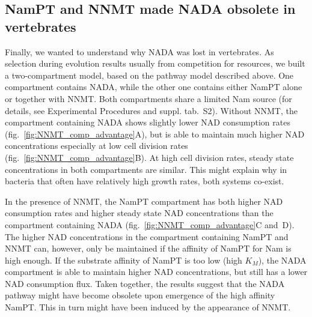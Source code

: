\subsection{NamPT and NNMT made NADA obsolete in vertebrates}

Finally, we wanted to understand why NADA was lost in vertebrates. As selection during evolution results usually from competition for resources, we built a two-compartment model, based on the pathway model described above. One compartment contains NADA, while the other one contains either NamPT alone or together with NNMT. Both compartments share a limited Nam source (for details, see Experimental Procedures and suppl. tab.~S2). Without NNMT, the compartment containing NADA shows slightly lower NAD consumption rates (fig.~\ref{fig:NNMT_comp_advantage}A), but is able to maintain much higher NAD concentrations especially at low cell division rates (fig.~\ref{fig:NNMT_comp_advantage}B). At high cell division rates, steady state concentrations in both compartments are similar. This might explain why in bacteria that often have relatively high growth rates, both systems co-exist.

In the presence of NNMT, the NamPT compartment has both higher NAD consumption rates and higher steady state NAD concentrations than the compartment containing NADA (fig.~\ref{fig:NNMT_comp_advantage}C and~D). The higher NAD concentrations in the compartment containing NamPT and NNMT can, however, only be maintained if the affinity of NamPT for Nam is high enough. If the substrate affinity of NamPT is too low (high $K_{M}$), the NADA compartment is able to maintain higher NAD concentrations, but still has a lower NAD consumption flux. Taken together, the results suggest that the NADA pathway might have become obsolete upon emergence of the high affinity NamPT. This in turn might have been induced by the appearance of NNMT.
